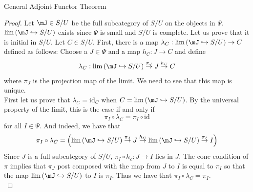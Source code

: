 \documentclass[a4paper]{article}
\begin{document}
\begin{thm}{General Adjoint Functor Theorem}{}
\begin{proof}
Let $\mJ\in S/U$ be the full subcategory of $S/U$ on the objects in $\Psi$. $\lim\left(\mJ\hookrightarrow S/U\right)$ exists since $\Psi$ is small and $S/U$ is complete. Let us prove that it is initial in $S/U$. Let $C\in S/U$. First, there is a map $\lambda_C:\lim\left(\mJ\hookrightarrow S/U\right)\to C$ defined as follows: Choose a $J\in\Psi$ and a map $h_C:J\to C$ and define $$\lambda_C:\lim\left(\mJ\hookrightarrow S/U\right)\overset{\pi_J}{\to}J\overset{h_C}{\to}C$$ where $\pi_J$ is the projection map of the limit. We need to see that this map is unique. \\

First let us prove that $\lambda_C=\text{id}_C$ when $C=\lim\left(\mJ\hookrightarrow S/U\right)$. By the universal property of the limit, this is the case if and only if $$\pi_I\circ\lambda_C=\pi_I\circ\text{id}$$ for all $I\in\Psi$. And indeed, we have that $$\pi_I\circ\lambda_C=\left(\lim\left(\mJ\hookrightarrow S/U\right)\overset{\pi_J}{\to}J\overset{h_C}{\to}\lim\left(\mJ\hookrightarrow S/U\right)\overset{\pi_I}{\to}I\right)$$ Since $J$ is a full subcategory of $S/U$, $\pi_I\circ h_c:J\to I$ lies in $J$. The cone condition of $\pi$ implies that $\pi_J$ post composed with the map from $J$ to $I$ is equal to $\pi_I$ so that the map $\lim\left(\mJ\hookrightarrow S/U\right)$ to $I$ is $\pi_I$. Thus we have that $\pi_I\circ\lambda_C=\pi_I$. \\


\end{proof}
\end{thm}
\end{document}
